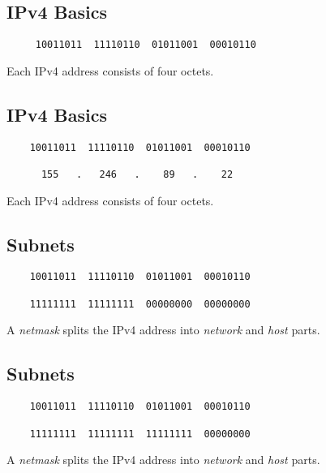 \documentclass[xga]{xdvislides}
\begin{document}
\subsection{IPv4 Basics}
\vspace{.5in}
\Hugesize
\begin{center}
\begin{verbatim}
     10011011  11110110  01011001  00010110
\end{verbatim}
\vspace{.5in}
Each IPv4 address consists of four octets.
\end{center}
\Normalsize

\subsection{IPv4 Basics}
\vspace{.5in}
\Hugesize
\begin{center}
\begin{verbatim}
    10011011  11110110  01011001  00010110

      155   .   246   .    89   .    22
\end{verbatim}
\vspace{.5in}
Each IPv4 address consists of four octets.
\end{center}
\Normalsize

\subsection{Subnets}
\vspace{.5in}
\Hugesize
\begin{center}
\begin{verbatim}
    10011011  11110110  01011001  00010110

    11111111  11111111  00000000  00000000
\end{verbatim}
\vspace{.5in}
A {\em netmask} splits the IPv4 address into {\em network} and {\em host}
parts.
\end{center}
\Normalsize

\subsection{Subnets}
\vspace{.5in}
\Hugesize
\begin{center}
\begin{verbatim}
    10011011  11110110  01011001  00010110

    11111111  11111111  11111111  00000000
\end{verbatim}
\vspace{.5in}
A {\em netmask} splits the IPv4 address into {\em network} and {\em host}
parts.
\end{center}
\Normalsize
\end{document}
